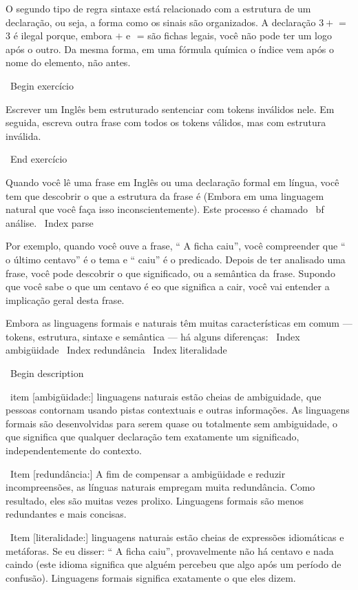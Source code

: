 \documentclass[10pt]{book}
\begin{document}
{O segundo tipo de regra sintaxe está relacionado com a estrutura de um
declaração, ou seja, a forma como os sinais são organizados. A declaração
$ 3 + $ = 3 é ilegal porque, embora $ + $ e $ $ = são
fichas legais, você não pode ter um logo após o outro. Da mesma forma,
em uma fórmula química o índice vem após o nome do elemento, não
antes.

\ Begin {} exercício

Escrever um Inglês bem estruturado
sentenciar com tokens inválidos nele. Em seguida, escreva outra frase
com todos os tokens válidos, mas com estrutura inválida.

\ End {} exercício

Quando você lê uma frase em Inglês ou uma declaração formal em
língua, você tem que descobrir o que a estrutura da frase é
(Embora em uma linguagem natural que você faça isso inconscientemente). Este
processo é chamado {\ bf análise}.
\ Index {} parse

Por exemplo, quando você ouve a frase, `` A ficha caiu'', você
compreender que `` o último centavo'' é o tema e `` caiu'' é o
predicado. Depois de ter analisado uma frase, você pode descobrir o que
significado, ou a semântica da frase. Supondo que você sabe
o que um centavo é eo que significa a cair, você vai entender a
implicação geral desta frase.

Embora as linguagens formais e naturais têm muitas características em
comum --- tokens, estrutura, sintaxe e semântica --- há alguns
diferenças:
\ Index {ambigüidade}
\ Index {redundância}
\ Index {} literalidade

\ Begin {description}

\ item [ambigüidade:] linguagens naturais estão cheias de ambiguidade, que
pessoas contornam usando pistas contextuais e outras informações.
As linguagens formais são desenvolvidas para serem quase ou totalmente sem ambiguidade,
o que significa que qualquer declaração tem exatamente um significado,
independentemente do contexto.

\ Item [redundância:] A fim de compensar a ambigüidade e reduzir
incompreensões, as línguas naturais empregam muita
redundância. Como resultado, eles são muitas vezes prolixo. Linguagens formais
são menos redundantes e mais concisas.

\ Item [literalidade:] linguagens naturais estão cheias de expressões idiomáticas e metáforas.
Se eu disser: `` A ficha caiu'', provavelmente não há centavo e
nada caindo (este idioma significa que alguém percebeu que algo
após um período de confusão). Linguagens formais
significa exatamente o que eles dizem.

}
\end{document}
